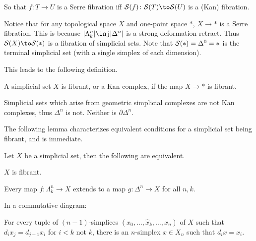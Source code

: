 \centerline{}

So that $f\colon T\to U$ is a Serre fibration iff $\S(f)\colon\S(T)\to\S(U)$ is a (Kan) fibration.

Notice that for any topological space $X$ and one-point space $*$, $X\to*$ is a Serre fibration.
This is because $\abs{\Lambda^n_k}\inj\abs{\Delta^n}$ is a strong deformation retract.
Thus $\S(X)\to\S(*)$ is a fibration of simplicial sets.
Note that $\S(*)=\Delta^0=*$ is the terminal simplicial set (with a single simplex of each dimension).

This leads to the following definition.

\bdefn

    A simplicial set $X$ is {\emphcolor fibrant}, or a {\emphcolor Kan complex}, if the map $X\to*$ is fibrant.

\edefn

Simplicial sets which arise from geometric simplicial complexes are not Kan complexes, thus $\Delta^n$ is not.
Neither is $\partial\Delta^n$.

The following lemma characterizes equivalent conditions for a simplicial set being fibrant, and is immediate.

\blemm[name={kancompequiv}]

    Let $X$ be a simplicial set, then the following are equivalent.
    \benum
        \item $X$ is fibrant.
        \item Every map $f\colon\Lambda^n_k\to X$ extends to a map $g\colon\Delta^n\to X$ for all $n,k$.

        In a commutative diagram:

        \centerline{}

        \item For every tuple of $(n-1)$-simplices $(x_0,\dots,\hat x_k,\dots,x_n)$ of $X$ such that $d_ix_j=d_{j-1}x_i$
        for $i<k$ not $k$, there is an $n$-simplex $x\in X_n$ such that $d_ix=x_i$.
    \eenum

